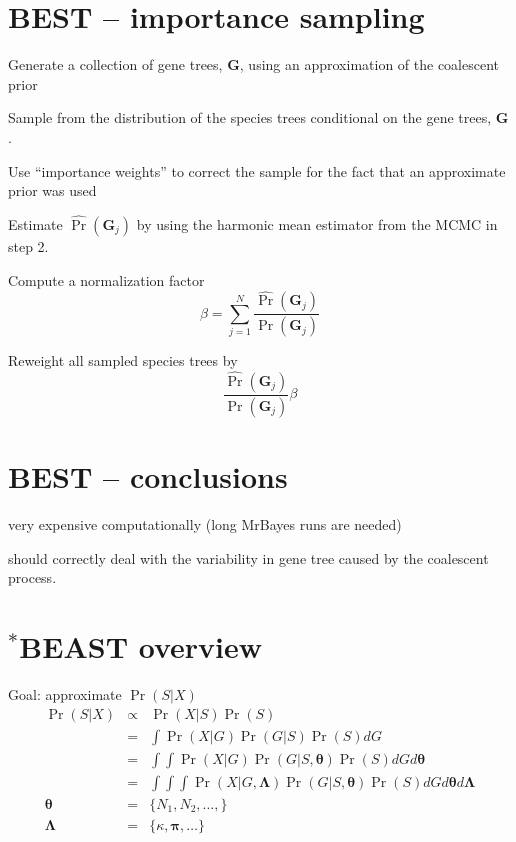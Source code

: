 \documentclass[landscape]{foils}
\begin{document}
\section*{BEST -- importance sampling}
\normalsize
\begin{compactenum}
	\item Generate a collection of gene trees, $\bm{G}$, using an approximation of the coalescent prior
	\item Sample from the distribution of the species trees conditional on the gene trees, $\bm{G}$.
	\item Use ``importance weights'' to correct the sample for the fact that an approximate prior was used
		\begin{compactenum}
		\item Estimate $\widehat{\Pr}(\bm{G}_j)$ by using the harmonic mean estimator from the MCMC in step 2.
		\item Compute a normalization factor \[\beta = \sum_{j=1}^N \frac{\widehat{\Pr}(\bm{G}_j)}{\Pr(\bm{G}_j)} \]
		  \item Reweight all sampled species trees by \[ \frac{\widehat{\Pr}(\bm{G}_j)}{\Pr(\bm{G}_j)}\beta\]
		\end{compactenum}
\end{compactenum}

\myNewSlide
\section*{BEST -- conclusions}
\large
\begin{compactenum}
	\item very expensive computationally (long MrBayes runs are needed)
	\item should correctly deal with the variability in gene tree caused by the coalescent process.
\end{compactenum}


\myNewSlide
\section*{$^{\ast}$BEAST overview}
Goal: approximate $\Pr(S|X)$
\begin{eqnarray*}
\Pr(S|X) & \propto & \Pr(X|S)\Pr(S) \\
 & = & \int\Pr(X|G)\Pr(G|S)\Pr(S)dG \\
 & = & \int\int\Pr(X|G)\Pr(G|S,\bm{\theta})\Pr(S)dGd{\bm{\theta}} \\
 & = & \int\int\int\Pr(X|G,\bm{\Lambda})\Pr(G|S,\bm{\theta})\Pr(S)dGd{\bm{\theta}}d\bm{\Lambda} \\
\bm{\theta} & = & \{N_1, N_2, \ldots, \} \\
\bm{\Lambda} & = & \{\kappa, \bm{\pi}, \ldots\} \\
\end{eqnarray*}
\end{document}
